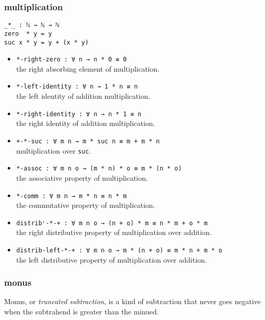 \documentclass[../thesis.tex]{subfiles}
\begin{document}
\subsubsection{multiplication}

\begin{lstlisting}
_*_ : ℕ → ℕ → ℕ
zero  * y = y
suc x * y = y + (x * y)
\end{lstlisting}

\begin{itemize}
    \item {\lstinline|*-right-zero : ∀ n → n * 0 ≡ 0|}
        \\ the right absorbing element of multiplication.
    \item {\lstinline|*-left-identity : ∀ n → 1 * n ≡ n|}
        \\ the left identity of addition multiplication.
    \item {\lstinline|*-right-identity : ∀ n → n * 1 ≡ n|}
        \\ the right identity of addition multiplication.
    \item {\lstinline|+-*-suc : ∀ m n → m * suc n ≡ m + m * n|}
        \\ multiplication over {\lstinline|suc|}.
    \item {\lstinline|*-assoc : ∀ m n o → (m * n) * o ≡ m * (n * o)|}
        \\ the associative property of multiplication.
    \item {\lstinline|*-comm : ∀ m n → m * n ≡ n * m|}
        \\ the commutative property of multiplication.
    \item {\lstinline|distribʳ-*-+ : ∀ m n o → (n + o) * m ≡ n * m + o * m|}
        \\ the right distributive property of multiplication over addition.
    \item {\lstinline|distrib-left-*-+ : ∀ m n o → m * (n + o) ≡ m * n + m * o|}
        \\ the left distributive property of multiplication over addition.
\end{itemize}

\subsubsection{monus}

Monus, or \textit{truncated subtraction}, is a kind of subtraction that never
goes negative when the subtrahend is greater than the minued.
\end{document}
